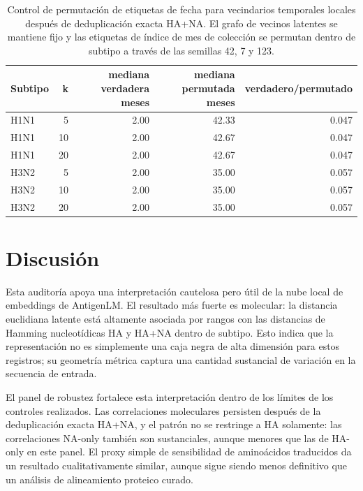 \documentclass[11pt]{article}
\begin{document}
\begin{table}[H]
\centering
\caption{Control de permutación de etiquetas de fecha para vecindarios temporales locales después de deduplicación exacta HA+NA. El grafo de vecinos latentes se mantiene fijo y las etiquetas de índice de mes de colección se permutan dentro de subtipo a través de las semillas 42, 7 y 123.}
\label{tab:temporal-permutation}
\begin{tabular}{lrrrr}
\toprule
Subtipo & k & mediana verdadera meses & mediana permutada meses & verdadero/permutado \\
\midrule
H1N1 & 5 & 2.00 & 42.33 & 0.047 \\
H1N1 & 10 & 2.00 & 42.67 & 0.047 \\
H1N1 & 20 & 2.00 & 42.67 & 0.047 \\
H3N2 & 5 & 2.00 & 35.00 & 0.057 \\
H3N2 & 10 & 2.00 & 35.00 & 0.057 \\
H3N2 & 20 & 2.00 & 35.00 & 0.057 \\
\bottomrule
\end{tabular}
\end{table}

\section{Discusión}

Esta auditoría apoya una interpretación cautelosa pero útil de la nube local de embeddings de AntigenLM. El resultado más fuerte es molecular: la distancia euclidiana latente está altamente asociada por rangos con las distancias de Hamming nucleotídicas HA y HA+NA dentro de subtipo. Esto indica que la representación no es simplemente una caja negra de alta dimensión para estos registros; su geometría métrica captura una cantidad sustancial de variación en la secuencia de entrada.

El panel de robustez fortalece esta interpretación dentro de los límites de los controles realizados. Las correlaciones moleculares persisten después de la deduplicación exacta HA+NA, y el patrón no se restringe a HA solamente: las correlaciones NA-only también son sustanciales, aunque menores que las de HA-only en este panel. El proxy simple de sensibilidad de aminoácidos traducidos da un resultado cualitativamente similar, aunque sigue siendo menos definitivo que un análisis de alineamiento proteico curado.
\end{document}
